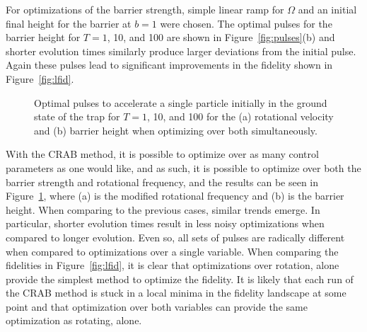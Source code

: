 For optimizations of the barrier strength, simple linear ramp for $\Omega$ and an initial final height for the barrier at $b = 1$ were chosen.
The optimal pulses for the barrier height for $T=1$, 10, and 100 are shown in Figure~\ref{fig:pulses}(b) and shorter evolution times similarly produce larger deviations from the initial pulse.
Again these pulses lead to significant improvements in the fidelity shown in Figure~\ref{fig:lfid}.

\begin{figure} 
\centering
 \caption{
 Optimal pulses to accelerate a single particle initially in the ground state of the trap
 for $T = 1$, 10, and 100 for the (a) rotational velocity and (b) barrier height when optimizing over both simultaneously. }
 \label{fig:pulses_pair}
\end{figure}

With the CRAB method, it is possible to optimize over as many control parameters as one would like, and as such, it is possible to optimize over both the barrier strength and rotational frequency, and the results can be seen in Figure~\ref{fig:pulses_pair}, where (a) is the modified rotational frequency and (b) is the barrier height.
When comparing to the previous cases, similar trends emerge.
In particular, shorter evolution times result in less noisy optimizations when compared to longer evolution.
Even so, all sets of pulses are radically different when compared to optimizations over a single variable.
When comparing the fidelities in Figure~\ref{fig:lfid}, it is clear that optimizations over rotation, alone provide the simplest method to optimize the fidelity.
It is likely that each run of the CRAB method is stuck in a local minima in the fidelity landscape at some point and that optimization over both variables can provide the same optimization as rotating, alone.

